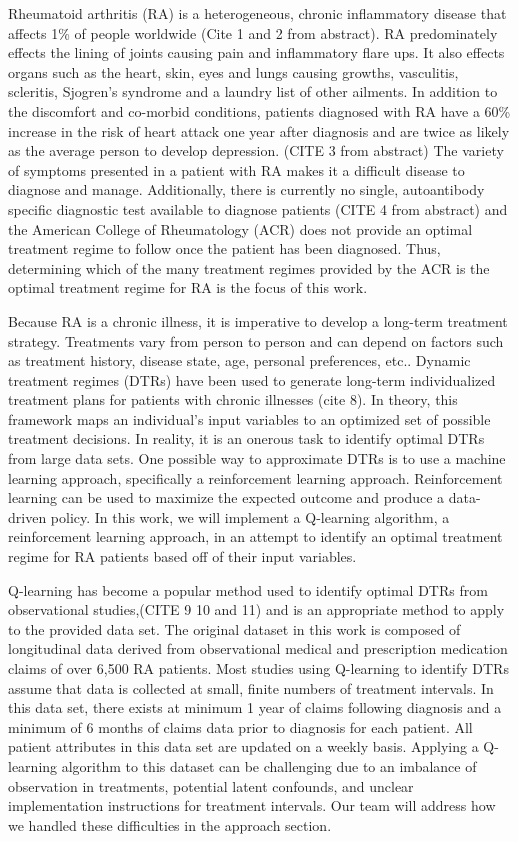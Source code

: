 \documentclass[10pt]{article}
\begin{document}
Rheumatoid arthritis (RA) is a heterogeneous, chronic inflammatory disease that affects 1\% of people worldwide (Cite 1 and 2 from abstract). RA predominately effects the lining of joints causing pain and inflammatory flare ups. It also effects organs such as the heart, skin, eyes and lungs causing growths, vasculitis, scleritis, Sjogren's syndrome and a laundry list of other ailments. In addition to the discomfort and co-morbid conditions, patients diagnosed with RA have a 60\% increase in the risk of heart attack one year after diagnosis and are twice as likely as the average person to develop depression. (CITE 3 from abstract) The variety of symptoms presented in a patient with RA makes it a difficult disease to diagnose and manage. Additionally, there is currently no single, autoantibody specific diagnostic test available to diagnose patients (CITE 4 from abstract) and the American College of Rheumatology (ACR) does not provide an optimal treatment regime to follow once the patient has been diagnosed. Thus, determining which of the many treatment regimes provided by the ACR is the optimal treatment regime for RA is the focus of this work.

Because RA is a chronic illness, it is imperative to develop a long-term treatment strategy. Treatments vary from person to person and can depend on factors such as treatment history, disease state, age, personal preferences, etc.. Dynamic treatment regimes (DTRs) have been used to generate long-term individualized treatment plans for patients with chronic illnesses (cite 8). In theory, this framework maps an individual's input variables to an optimized set of possible treatment decisions. In reality, it is an onerous task to identify optimal DTRs from large data sets. One possible way to approximate DTRs is to use a machine learning approach, specifically a reinforcement learning approach. Reinforcement learning can be used to maximize the expected outcome and produce a data-driven policy. In this work, we will implement a Q-learning algorithm, a reinforcement learning approach, in an attempt to identify an optimal treatment regime for RA patients based off of their input variables.

Q-learning has become a popular method used to identify optimal DTRs from observational studies,(CITE 9 10 and 11) and is an appropriate method to apply to the provided data set. The original dataset in this work is composed of longitudinal data derived from observational medical and prescription medication claims of over 6,500 RA patients. Most studies using Q-learning to identify DTRs assume that data is collected at small, finite numbers of treatment intervals. In this data set, there exists at minimum 1 year of claims following diagnosis and a minimum of 6 months of claims data prior to diagnosis for each patient. All patient attributes in this data set are updated on a weekly basis. Applying a Q-learning algorithm to this dataset can be challenging due to an imbalance of observation in treatments, potential latent confounds, and unclear implementation instructions for treatment intervals. Our team will address how we handled these difficulties in the approach section.
\end{document}
